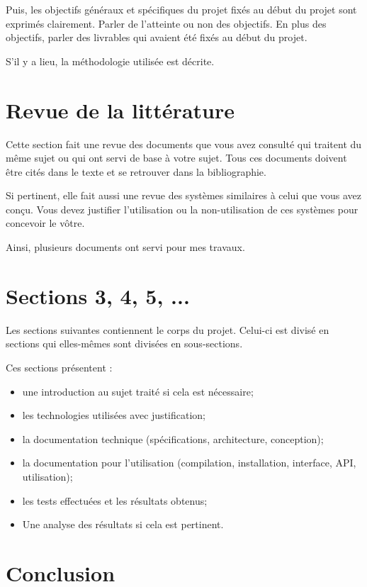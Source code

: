 \documentclass[12pt,fleqn]{article}
\begin{document}
Puis, les objectifs généraux et spécifiques du projet fixés au début du projet sont exprimés clairement. Parler de l'atteinte ou non des objectifs. En plus des objectifs, parler des livrables qui avaient été fixés au début du projet.

S’il y a lieu, la méthodologie utilisée est décrite.


\section{Revue de la littérature}

Cette section fait une revue des documents que vous avez consulté qui traitent du même sujet ou qui ont servi de base à votre sujet.  Tous ces documents doivent être cités dans le texte et se retrouver dans la bibliographie.

Si pertinent, elle fait aussi une revue des systèmes similaires à celui que vous avez conçu.  Vous devez justifier l'utilisation ou la non-utilisation de ces systèmes pour concevoir le vôtre.

Ainsi, plusieurs documents\cite{FirstNas} ont servi pour mes travaux.

\section{Sections 3, 4, 5, ...}

Les sections suivantes contiennent le corps du projet. Celui-ci est divisé en sections qui elles-mêmes sont divisées
en sous-sections.


Ces sections présentent :

\begin{itemize}
\item une introduction au sujet traité si cela est nécessaire;
\item les technologies utilisées avec justification;
\item la documentation technique (spécifications, architecture, conception);
\item la documentation pour l'utilisation (compilation, installation, interface, API, utilisation);
\item les tests effectuées et les résultats obtenus;
\item Une analyse des résultats si cela est pertinent.
\end{itemize}



\section{Conclusion}
\end{document}
